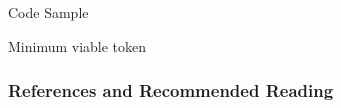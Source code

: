 \documentclass[]{beamer}
\begin{document}
\begin{frame}{Code Sample}
	\begin{samplecode}{Minimum viable token}
		
	\end{samplecode}
\end{frame}


\begin{frame}%
\frametitle{References and Recommended Reading}
	
	
\end{frame}
\end{document}
